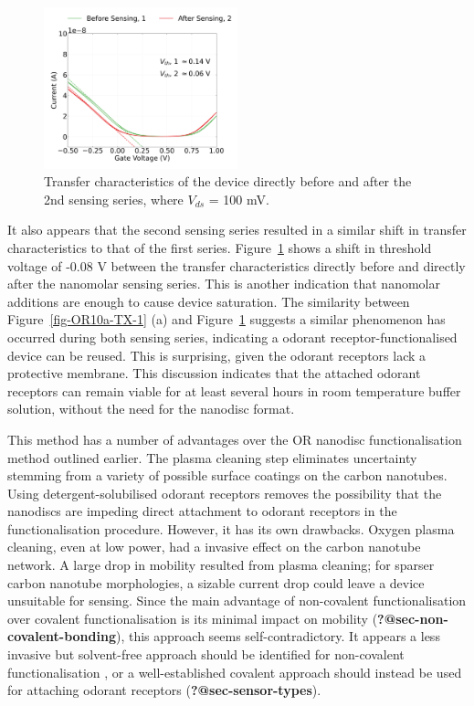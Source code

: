 \documentclass[
  a4paper,
]{scrbook}
\begin{document}
\begin{figure}

{\centering \includegraphics[width=0.5\textwidth,height=\textheight]{figures/ch8/NTQ39C7_ch2_before_after_sensing_2.png}

}

\caption{\label{fig-OR10a-TX-2}Transfer characteristics of the device
directly before and after the 2nd sensing series, where \(V_{ds}\) = 100
mV.}

\end{figure}

It also appears that the second sensing series resulted in a similar
shift in transfer characteristics to that of the first series.
Figure~\ref{fig-OR10a-TX-2} shows a shift in threshold voltage of -0.08
V between the transfer characteristics directly before and directly
after the nanomolar sensing series. This is another indication that
nanomolar additions are enough to cause device saturation. The
similarity between Figure~\ref{fig-OR10a-TX-1} (a) and
Figure~\ref{fig-OR10a-TX-2} suggests a similar phenomenon has occurred
during both sensing series, indicating a odorant receptor-functionalised
device can be reused. This is surprising, given the odorant receptors
lack a protective membrane. This discussion indicates that the attached
odorant receptors can remain viable for at least several hours in room
temperature buffer solution, without the need for the nanodisc format.

This method has a number of advantages over the OR nanodisc
functionalisation method outlined earlier. The plasma cleaning step
eliminates uncertainty stemming from a variety of possible surface
coatings on the carbon nanotubes. Using detergent-solubilised odorant
receptors removes the possibility that the nanodiscs are impeding direct
attachment to odorant receptors in the functionalisation procedure.
However, it has its own drawbacks. Oxygen plasma cleaning, even at low
power, had a invasive effect on the carbon nanotube network. A large
drop in mobility resulted from plasma cleaning; for sparser carbon
nanotube morphologies, a sizable current drop could leave a device
unsuitable for sensing. Since the main advantage of non-covalent
functionalisation over covalent functionalisation is its minimal impact
on mobility (\textbf{?@sec-non-covalent-bonding}), this approach seems
self-contradictory. It appears a less invasive but solvent-free approach
should be identified for non-covalent functionalisation
\autocite{Ashraf2014}, or a well-established covalent approach should
instead be used for attaching odorant receptors
(\textbf{?@sec-sensor-types}).
\end{document}

